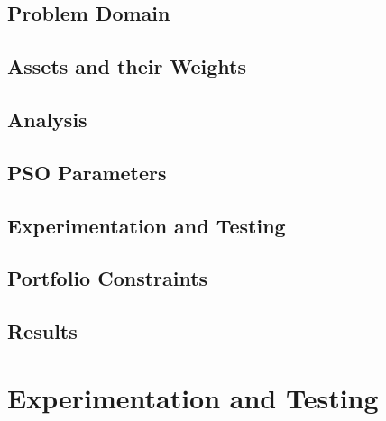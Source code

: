 \documentclass{pdfmx4020}
\begin{document}
  \section{Problem Domain} %
  \label{sec:problem_domain}
  

  \section{Assets and their Weights} %
  \label{sec:assets_and_their_weights}
  

  \section{Analysis} %
  \label{sec:analysis}
  

  \section{PSO Parameters} %
  \label{sec:pso_parameters}
  

  \section{Experimentation and Testing} %
  \label{sec:experimentation_and_testing}
  

  \section{Portfolio Constraints} %
  \label{sec:portfolio_constraints}
  

  \section{Results} %
  \label{sec:results}
  


\chapter{Experimentation and Testing}
\end{document}
